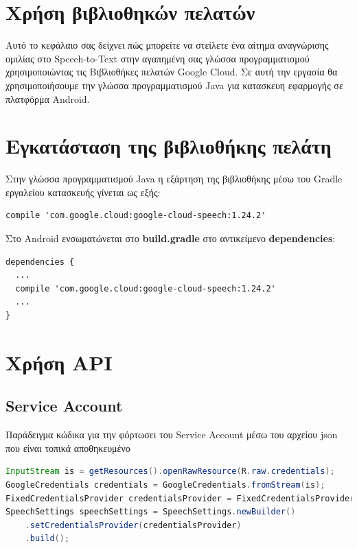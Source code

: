 \documentclass[oneside, 12pt]{book}
\begin{document}
\section{Χρήση βιβλιοθηκών πελατών}\label{sec:χρήση-βιβλιοθηκών-πελατών}
Αυτό το κεφάλαιο σας δείχνει πώς μπορείτε να στείλετε ένα αίτημα αναγνώρισης ομιλίας στο
Speech-to-Text στην αγαπημένη σας γλώσσα προγραμματισμού χρησιμοποιώντας τις Βιβλιοθήκες πελατών
Google Cloud.
Σε αυτή την εργασία θα χρησιμοποιήσουμε την γλώσσα προγραμματισμού Java για κατασκευη εφαρμογής σε πλατφόρμα Android.
\section{Εγκατάσταση της βιβλιοθήκης πελάτη}\label{subsec:εγκατάσταση-της-βιβλιοθήκης-πελάτη}
Στην γλώσσα προγραμματισμού Java η εξάρτηση της βιβλιοθήκης μέσω του Gradle εργαλείου κατασκευής γίνεται ως εξής:
\begin{lstlisting}
compile 'com.google.cloud:google-cloud-speech:1.24.2'
\end{lstlisting}
Στο Android ενσωματώνεται στο \textbf{build.gradle} στο αντικείμενο \textbf{dependencies}:
\begin{lstlisting}
dependencies {
  ...
  compile 'com.google.cloud:google-cloud-speech:1.24.2'
  ...
}
\end{lstlisting}
\section{Χρήση API}\label{sec:χρήση-api}
\subsection{Service Account}\label{subsec:service-account}
Παράδειγμα κώδικα για την φόρτωσει του Service Account μέσω του αρχείου json που είναι τοπικά αποθηκευμένο
\begin{lstlisting}[language=java]
InputStream is = getResources().openRawResource(R.raw.credentials);
GoogleCredentials credentials = GoogleCredentials.fromStream(is);
FixedCredentialsProvider credentialsProvider = FixedCredentialsProvider.create(credentials);
SpeechSettings speechSettings = SpeechSettings.newBuilder()
    .setCredentialsProvider(credentialsProvider)
    .build();
\end{lstlisting}
\end{document}
